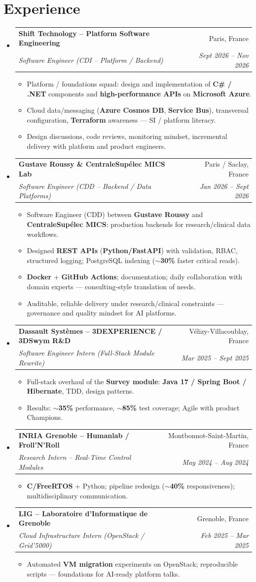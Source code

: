 \documentclass[letterpaper,10.5pt]{article}
\makeatletter
\newcommand{\resumeItem}[1]{\item\small{#1 \vspace{-1.5pt}}}
\newcommand{\resumeSubheading}[4]{\vspace{-1pt}\item\begin{tabular*}{0.97\textwidth}[t]{l@{\extracolsep{\fill}}r}\textbf{#1} & #2 \\\textit{\small#3} & \textit{\small #4} \\\end{tabular*}\vspace{-5pt}}
\newcommand{\resumeSubHeadingListStart}{\begin{itemize}[leftmargin=0.15in, label={}]}
\newcommand{\resumeSubHeadingListEnd}{\end{itemize}}
\newcommand{\resumeItemListStart}{\begin{itemize}[leftmargin=0.18in]}
\newcommand{\resumeItemListEnd}{\end{itemize}\vspace{-3pt}}
\makeatother
\begin{document}
\section{Experience}
\resumeSubHeadingListStart
  \resumeSubheading
    {Shift Technology -- Platform Software Engineering}{Paris, France}
    {Software Engineer (CDI -- Platform / Backend)}{Sept 2026 -- Nov 2026}
    \resumeItemListStart
      \resumeItem{Platform / foundations squad: design and implementation of \textbf{C\# / .NET} components and \textbf{high-performance APIs} on \textbf{Microsoft Azure}.}
      \resumeItem{Cloud data/messaging (\textbf{Azure Cosmos DB}, \textbf{Service Bus}), transversal configuration, \textbf{Terraform} awareness --- SI / platform literacy.}
      \resumeItem{Design discussions, code reviews, monitoring mindset, incremental delivery with platform and product engineers.}
    \resumeItemListEnd
  \resumeSubheading
    {Gustave Roussy \& CentraleSup\'elec MICS Lab}{Paris / Saclay, France}
    {Software Engineer (CDD -- Backend / Data Platforms)}{Jan 2026 -- Sept 2026}
    \resumeItemListStart
      \resumeItem{Software Engineer (CDD) between \textbf{Gustave Roussy} and \textbf{CentraleSup\'elec MICS}: production backends for research/clinical data workflows.}
      \resumeItem{Designed \textbf{REST APIs} (\textbf{Python/FastAPI}) with validation, RBAC, structured logging; PostgreSQL indexing (\textbf{$\sim$30\%} faster critical reads).}
      \resumeItem{\textbf{Docker} + \textbf{GitHub Actions}; documentation; daily collaboration with domain experts --- consulting-style translation of needs.}
      \resumeItem{Auditable, reliable delivery under research/clinical constraints --- governance and quality mindset for AI platforms.}
    \resumeItemListEnd
  \resumeSubheading
    {Dassault Syst\`emes -- 3DEXPERIENCE / 3DSwym R\&D}{V\'elizy-Villacoublay, France}
    {Software Engineer Intern (Full-Stack Module Rewrite)}{Mar 2025 -- Sept 2025}
    \resumeItemListStart
      \resumeItem{Full-stack overhaul of the \textbf{Survey module}: \textbf{Java 17 / Spring Boot / Hibernate}, TDD, design patterns.}
      \resumeItem{Results: \textbf{$\sim$35\%} performance, \textbf{$\sim$85\%} test coverage; Agile with product Champions.}
    \resumeItemListEnd
  \resumeSubheading
    {INRIA Grenoble -- Humanlab / Froll'N'Roll}{Montbonnot-Saint-Martin, France}
    {Research Intern -- Real-Time Control Modules}{May 2024 -- Aug 2024}
    \resumeItemListStart
      \resumeItem{\textbf{C/FreeRTOS} + Python; pipeline redesign (\textbf{$\sim$40\%} responsiveness); multidisciplinary communication.}
    \resumeItemListEnd
  \resumeSubheading
    {LIG -- Laboratoire d'Informatique de Grenoble}{Grenoble, France}
    {Cloud Infrastructure Intern (OpenStack / Grid'5000)}{Feb 2025 -- Mar 2025}
    \resumeItemListStart
      \resumeItem{Automated \textbf{VM migration} experiments on OpenStack; reproducible scripts --- foundations for AI-ready platform talks.}
    \resumeItemListEnd
\resumeSubHeadingListEnd
\end{document}
